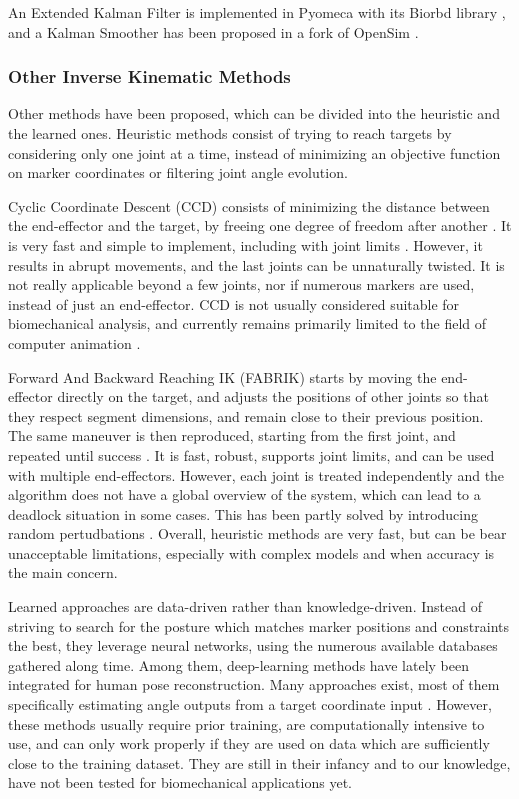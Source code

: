 An Extended Kalman Filter is implemented in Pyomeca with its Biorbd library \cite{Michaud2021}, and a Kalman Smoother has been proposed in a fork of OpenSim \cite{DeGroote2008}.



\subsubsection{Other Inverse Kinematic Methods}

Other methods have been proposed, which can be divided into the heuristic and the learned ones. Heuristic methods consist of trying to reach targets by considering only one joint at a time, instead of minimizing an objective function on marker coordinates or filtering joint angle evolution. 

Cyclic Coordinate Descent (CCD) consists of minimizing the distance between the end-effector and the target, by freeing one degree of freedom after another \cite{Wang1991}. It is very fast and simple to implement, including with joint limits \cite{Welman1993}. However, it results in abrupt movements, and the last joints can be unnaturally twisted. It is not really applicable beyond a few joints, nor if numerous markers are used, instead of just an end-effector. CCD is not usually considered suitable for biomechanical analysis, and currently remains primarily limited to the field of computer animation \cite{Kulpa2005}. 

Forward And Backward Reaching IK (FABRIK) starts by moving the end-effector directly on the target, and adjusts the positions of other joints so that they respect segment dimensions, and remain close to their previous position. The same maneuver is then reproduced, starting from the first joint, and repeated until success \cite{Aristidou2011}. It is fast, robust, supports joint limits, and can be used with multiple end-effectors. However, each joint is treated independently and the algorithm does not have a global overview of the system, which can lead to a deadlock situation in some cases. This has been partly solved by introducing random pertudbations \cite{Aristidou2016}. Overall, heuristic methods are very fast, but can be bear unacceptable limitations, especially with complex models and when accuracy is the main concern.

Learned approaches are data-driven rather than knowledge-driven. Instead of striving to search for the posture which matches marker positions and constraints the best, they leverage neural networks, using the numerous available databases gathered along time. Among them, deep-learning methods have lately been integrated for human pose reconstruction. Many approaches exist, most of them specifically estimating angle outputs from a target coordinate input \cite{Mordatch2015,Du2015}. However, these methods usually require prior training, are computationally intensive to use, and can only work properly if they are used on data which are sufficiently close to the training dataset. They are still in their infancy and to our knowledge, have not been tested for biomechanical applications yet.


